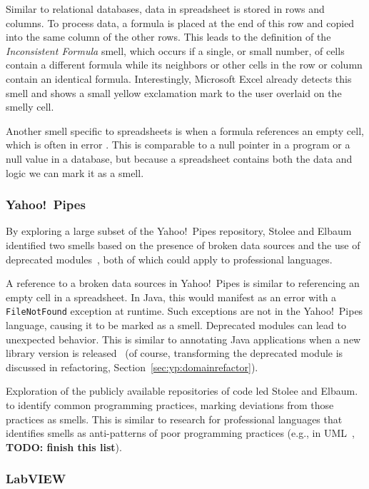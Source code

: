 \documentclass[10pt,conference,compsocconf]{IEEEtran}
\newcommand{\todo}[1]{\textbf{TODO: #1}}
\begin{document}
Similar to relational databases, data in spreadsheet is stored in rows and columns.
To process data, a formula is placed at the end of this row and copied into the same column of the other rows.
This leads to the definition of the \emph{Inconsistent Formula} smell, which occurs if a single, or small number, of cells contain a different formula while its neighbors or other cells in the row or column contain an identical formula.
Interestingly, Microsoft Excel already detects this smell and shows a small yellow exclamation mark to the user overlaid on the smelly cell.

Another smell specific to spreadsheets is when a formula references an empty cell, which is often in error \cite{cunha2012towards}.
This is comparable to a null pointer in a program or a null value in a database, but because a spreadsheet contains both the data and logic we can mark it as a smell.

\subsubsection{Yahoo!\ Pipes}
By exploring a large subset of the Yahoo!\ Pipes repository, Stolee and Elbaum identified two smells based on the presence of broken data sources and the use of deprecated modules~\cite{StoleeTSE2013}, both of which could apply to professional languages.

A reference to a broken data sources in Yahoo!\ Pipes is similar to referencing an empty cell in a spreadsheet. In Java, this would manifest as an error with a {\tt FileNotFound} exception at runtime. Such exceptions are not in the Yahoo!\ Pipes language, causing it to be marked as a smell. 
Deprecated modules can lead to unexpected behavior. 
This is similar to annotating Java applications when a new library version is released~\cite{Tansey:2008:ARI:1449955.1449788} (of course, transforming the deprecated module is discussed in refactoring, Section~\ref{sec:yp:domainrefactor}).

Exploration of the publicly available repositories of code led Stolee and Elbaum. to  identify common programming practices, marking deviations from those practices as smells. This is 
similar to research for professional languages that identifies smells  as anti-patterns of poor programming practices (e.g., in UML~\cite{Enckevort:2009:RUM:1639950.1639959}, \todo{finish this list}). 


\subsubsection{LabVIEW}
\end{document}
